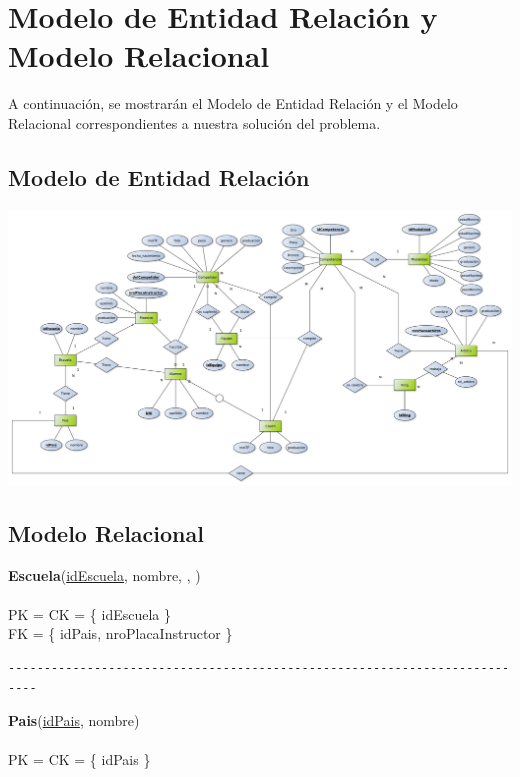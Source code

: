 \section{Modelo de Entidad Relación y Modelo Relacional}

A continuación, se mostrarán el Modelo de Entidad Relación y el Modelo Relacional correspondientes a nuestra solución del problema.\\

\subsection{Modelo de Entidad Relación}


\begin{center}
\includegraphics[width=20cm,keepaspectratio,angle=90]{./imagenes/DER.pdf}\newline
\end{center}

\newpage
\subsection{Modelo Relacional}

\noindent\textbf{Escuela}(\uline{idEscuela}, nombre, , ) 
\\
\\
PK = CK = \{ idEscuela \} \\
FK = \{ idPais, nroPlacaInstructor \} \\

\begin{verbatim}
--------------------------------------------------------------------------
\end{verbatim}

\noindent\textbf{Pais}(\uline{idPais}, nombre)
\\
\\
PK = CK = \{ idPais \} \\


